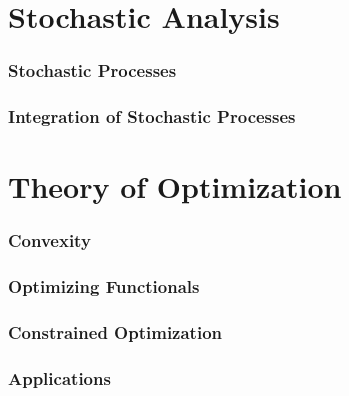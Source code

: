 \documentclass{article}
\theoremstyle{definition}
\begin{document}
	\part{Stochastic Analysis}
	\section{Stochastic Processes}
	\section{Integration of Stochastic Processes}
	\part{Theory of Optimization}
	\section{Convexity}
	\section{Optimizing Functionals}
	\section{Constrained Optimization}
	\section{Applications}
	\newpage
	{} 
\end{document}
